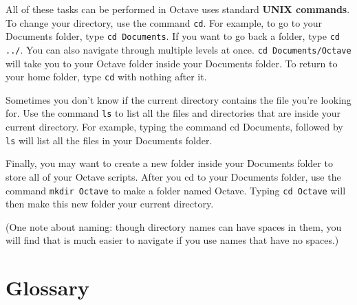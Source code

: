 \documentclass{book}
\begin{document}
All of these tasks can be performed in Octave uses standard {\bf UNIX commands}.
To change your directory, use the command {\tt cd}. For example, to go to your
Documents folder, type {\tt cd Documents}. If you want to go back a folder, type
{\tt cd ../}. You can also navigate through multiple levels at once. {\tt cd
Documents/Octave} will take you to your Octave folder inside your Documents
folder. To return to your home folder, type {\tt cd} with nothing after it.

Sometimes you don't know if the current directory contains the file you're
looking for. Use the command {\tt ls} to list all the files and directories that
are inside your current directory. For example, typing the command {cd
Documents}, followed by {\tt ls} will list all the files in your Documents
folder.

Finally, you may want to create a new folder inside your Documents folder to
store all of your Octave scripts. After you cd to your Documents folder, use
the command {\tt mkdir Octave} to make a folder named Octave. Typing {\tt cd
Octave} will then make this new folder your current directory.

(One note about naming: though directory names can have spaces in them, you
will find that is much easier to navigate if you use names that have
no spaces.)

\section{Glossary}
\end{document}
